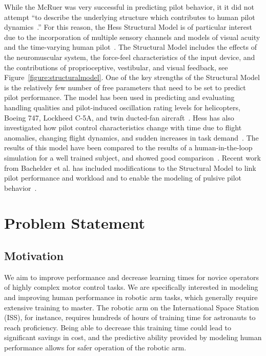 While the McRuer was very successful in predicting pilot behavior, it it did not attempt ``to describe the underlying structure which contributes to human pilot dynamics~\citep{hess_structural_1980}.''
For this reason, the Hess Structural Model is of particular interest due to the incorporation of multiple sensory channels and models of visual acuity and the time-varying human pilot~\citep{hess_modeling_2009}.
The Structural Model includes the effects of the neuromuscular system, the force-feel characteristics of the input device, and the contributions of proprioceptive, vestibular, and visual feedback, see Figure~\ref{figure:structuralmodel}.
One of the key strengths of the Structural Model is the relatively few number of free parameters that need to be set to predict pilot performance.
The model has been used in predicting and evaluating handling qualities and pilot-induced oscillation rating levels for helicopters, Boeing 747, Lockheed C-5A, and twin ducted-fan aircraft~\citep{hess_analytical_2013, andreea-irina_prediction_2014, grant_handling_2015}.
Hess has also investigated how pilot control characteristics change with time due to flight anomalies, changing flight dynamics, and sudden increases in task demand~\citep{hess_modeling_2009, hess_modeling_2016}.
The results of this model have been compared to the results of a human-in-the-loop simulation for a well trained subject, and showed good comparison~\citep{hess_modeling_2016}.
Recent work from Bachelder et al. has included modifications to the Structural Model to link pilot performance and workload and to enable the modeling of pulsive pilot behavior~\citep{bachelder_modeling_2017, bachelder_linking_2018}.


% 
\section{Problem Statement}
\subsection{Motivation}
We aim to improve performance and decrease learning times for novice operators of highly complex motor control tasks.
We are specifically interested in modeling and improving human performance in robotic arm tasks, which generally require extensive training to master.
The robotic arm on the International Space Station (ISS), for instance, requires hundreds of hours of training time for astronauts to reach proficiency.
Being able to decrease this training time could lead to significant savings in cost, and the predictive ability provided by modeling human performance allows for safer operation of the robotic arm.

